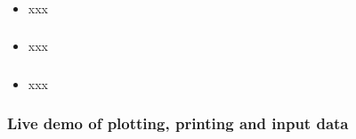 \documentclass[14pt]{beamer}
\begin{document}

\begin{frame}[fragile]
\frametitle{}
\begin{itemize}
\item xxx
\end{itemize}

\end{frame}


\begin{frame}[fragile]
\frametitle{}
\begin{itemize}
\item xxx
\end{itemize}

\end{frame}


\begin{frame}[fragile]
\frametitle{}
\begin{itemize}
\item xxx
\end{itemize}

\end{frame}


\begin{frame}[fragile]
\frametitle{Live demo of plotting, printing and input data}

\end{frame}
\end{document}
